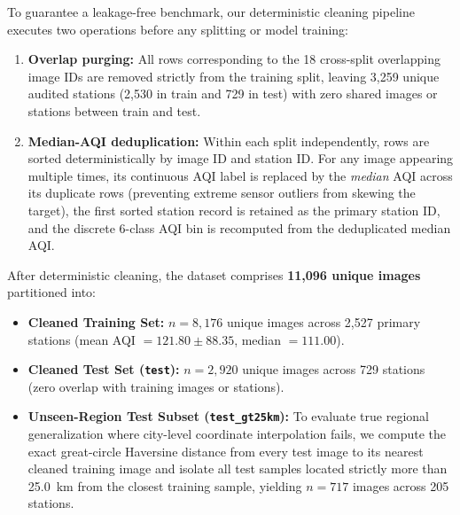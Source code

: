 \documentclass[conference]{IEEEtran}
\begin{document}
To guarantee a leakage-free benchmark, our deterministic cleaning pipeline
executes two operations before any splitting or model training:
\begin{enumerate}
  \item \textbf{Overlap purging:} All rows corresponding to the 18 cross-split
        overlapping image IDs are removed strictly from the training split,
        leaving 3,259 unique audited stations (2,530 in train and 729 in test)
        with zero shared images or stations between train and test.
  \item \textbf{Median-AQI deduplication:} Within each split independently, rows
        are sorted deterministically by image ID and station ID. For any image
        appearing multiple times, its continuous AQI label is replaced by the
        \textit{median} AQI across its duplicate rows (preventing extreme sensor
        outliers from skewing the target), the first sorted station record is
        retained as the primary station ID, and the discrete 6-class AQI bin is
        recomputed from the deduplicated median AQI.
\end{enumerate}

After deterministic cleaning, the dataset comprises \textbf{11,096 unique
images} partitioned into:
\begin{itemize}
  \item \textbf{Cleaned Training Set:} $n = 8,176$ unique images across 2,527
        primary stations (mean AQI $= 121.80 \pm 88.35$, median $= 111.00$).
  \item \textbf{Cleaned Test Set (\texttt{test}):} $n = 2,920$ unique images
        across 729 stations (zero overlap with training images or stations).
  \item \textbf{Unseen-Region Test Subset (\texttt{test\_gt25km}):} To evaluate
        true regional generalization where city-level coordinate interpolation
        fails, we compute the exact great-circle Haversine distance from every
        test image to its nearest cleaned training image and isolate all test
        samples located strictly more than 25.0~km from the closest training
        sample, yielding $n = 717$ images across 205 stations.
\end{itemize}
\end{document}
